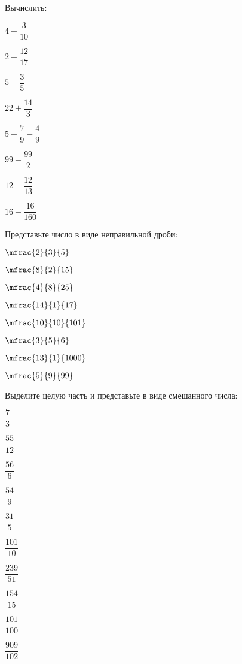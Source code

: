 \begin{class}[number=2]
	\begin{listofex}
		\item Вычислить:
		\begin{enumcols}[itemcolumns=4]
			\item \( 4+\dfrac{3}{10} \)
			\item \( 2+\dfrac{12}{17} \)
			\item \( 5-\dfrac{3}{5} \)
			\item \( 22+\dfrac{14}{3} \)
			\item \( 5+\dfrac{7}{9}-\dfrac{4}{9} \)
			\item \( 99-\dfrac{99}{2} \)
			\item \( 12-\dfrac{12}{13} \)
			\item \( 16-\dfrac{16}{160} \)
		\end{enumcols}
		\item Представьте число в виде неправильной дроби:
		\begin{enumcols}[itemcolumns=4]
			\item \( \mfrac{2}{3}{5} \)
			\item \( \mfrac{8}{2}{15} \)
			\item \( \mfrac{4}{8}{25} \)
			\item \( \mfrac{14}{1}{17} \)
			\item \( \mfrac{10}{10}{101} \)
			\item \( \mfrac{3}{5}{6} \)
			\item \( \mfrac{13}{1}{1000} \)
			\item \( \mfrac{5}{9}{99} \)
		\end{enumcols}
		\item Выделите целую часть и представьте в виде смешанного числа:
		\begin{enumcols}[itemcolumns=5]
			\item \( \dfrac{7}{3} \)
			\item \( \dfrac{55}{12} \)
			\item \( \dfrac{56}{6} \)
			\item \( \dfrac{54}{9} \)
			\item \( \dfrac{31}{5} \)
			\item \( \dfrac{101}{10} \)
			\item \( \dfrac{239}{51} \)
			\item \( \dfrac{154}{15} \)
			\item \( \dfrac{101}{100} \)
			\item \( \dfrac{909}{102} \)
		\end{enumcols}

\end{listofex}
\end{class}
